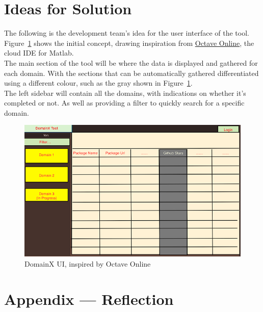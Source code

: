 \documentclass[12pt]{article}
\begin{document}
\section{Ideas for Solution}
The following is the development team's idea for the user interface of the tool. Figure~\ref{fig:domainx_ui} shows the initial concept, drawing inspiration from \href{https://octave-online.net/}{Octave Online}, the cloud IDE for Matlab.
\\ The main section of the tool will be where the data is displayed and gathered for each domain. With the sections that can be automatically gathered differentiated using a different colour, such as the gray shown in Figure~\ref{fig:domainx_ui}.
\\ The left sidebar will contain all the domains, with indications on whether it's completed or not. As well as providing a filter to quickly search for a specific domain.
\begin{figure}
\centering
  \includegraphics[totalheight=8cm]{images/DomainX-UI.png}
  \caption{DomainX UI, inspired by Octave Online}
  \label{fig:domainx_ui}
\end{figure}
\newpage{}
\section*{Appendix --- Reflection}




\end{document}
